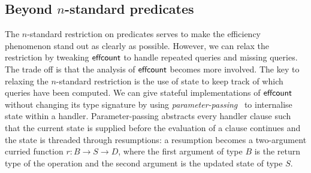 \documentclass[12pt,phd,lfcs,twoside,openright,logo,leftchapter,normalheadings]{infthesis}
\theoremstyle{plain}
\theoremstyle{definition}
\begin{document}
\subsection{Beyond $n$-standard predicates}
\label{sec:beyond}
The $n$-standard restriction on predicates serves to make the
efficiency phenomenon stand out as clearly as possible. However, we
can relax the restriction by tweaking $\mathsf{effcount}$ to handle repeated
queries and missing queries.
%
The trade off is that the analysis of $\mathsf{effcount}$ becomes more involved.
%
The key to relaxing the $n$-standard restriction is the use of state
to keep track of which queries have been computed.
%
We can give stateful implementations of $\mathsf{effcount}$ without changing its
type signature by using \emph{parameter-passing}~\citep{KammarLO13,
  Pretnar15} to internalise state within a handler.
%
Parameter-passing abstracts every handler clause such that the current
state is supplied before the evaluation of a clause continues and the
state is threaded through resumptions: a resumption becomes a
two-argument curried function $r : B \to S \to D$, where the first
argument of type $B$ is the return type of the operation and the
second argument is the updated state of type $S$.
\end{document}

